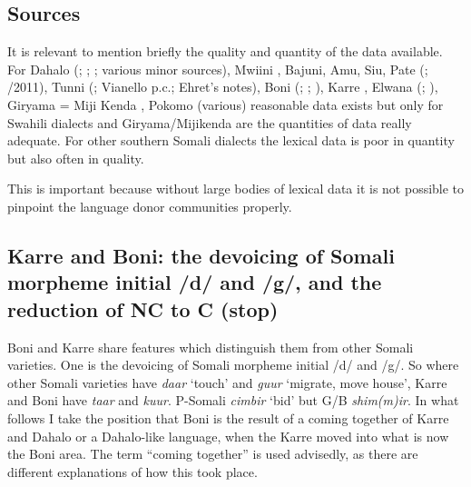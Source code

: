 \documentclass[output=paper,newtxmath,modfonts,nonflat,hidelinks]{langsci/langscibook}
\begin{document}
\subsection{Sources}\label{sec:nurse:5.1} It is relevant to mention briefly the quality and quantity of the data available. For Dahalo (\citealt{Nurse1986}; \citealt{Ehret1989}; \citealt{Tosco1991}; various minor sources), Mwiini \citep{Kisseberth2004}, Bajuni, Amu, Siu, Pate (\citealt{Sacleux1939}; \citealt{Nurse2013}/2011), Tunni (\citealt{Tosco1997}; Vianello p.c.; Ehret's notes), Boni  (\citealt{Heine1977}; \citeyear{heine1982}; \citealt{sasse1979}), Karre \citep{Tosco1994}, Elwana (\citealt{nurse1994}; \citeyear{Nurse2000}), Giryama = Miji Kenda \citep{Deed1964}, Pokomo (various) reasonable data exists but only for Swahili dialects and Giryama/Mijikenda are the quantities of data really adequate. For other southern Somali dialects the lexical data is poor in quantity but also often in quality. 

  This is important because without large bodies of lexical data it is not possible to pinpoint the language donor communities properly.

\subsection{Karre and Boni: the devoicing of Somali morpheme initial /d/ and /g/, and the reduction of NC to C (stop)}\label{sec:nurse:5.2} Boni and Karre share features which distinguish them from other Somali varieties. One is the devoicing of Somali morpheme initial /d/ and /g/. So where other Somali varieties have \textit{daar} ‘touch’ and \textit{guur} ‘migrate, move house’, Karre and Boni have \textit{taar} and \textit{kuur}. P-Somali \textit{cimbir} ‘bid’ but G/B \textit{shim(m)ir}. In what follows I take the position that Boni is the result of a coming together of Karre and Dahalo or a Dahalo-like language, when the Karre moved into what is now the Boni area. The term “coming together” is used advisedly, as there are different explanations of how this took place.  
\end{document}
